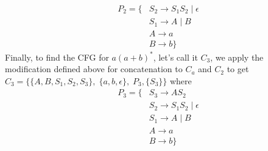 \documentclass[12pt]{article}
\begin{document}
\begin{itemize}
\begin{align}
\nonumber P_2 = \{&S_2 \rightarrow S_1S_2\;|\;\epsilon \\
\nonumber &S_1 \rightarrow A\;|\;B \\
\nonumber &A \rightarrow a \\
\nonumber &B \rightarrow b\}
\end{align}
Finally, to find the CFG for $a(a+b)^*$, let's call it $C_3$, we apply the modification defined above for concatenation to $C_a$ and $C_2$ to get $C_3=\{\{A,B, S_1, S_2, S_3\},\; \{a,b,\epsilon\},\; P_3, \{S_3\}\}$ where 
\begin{align}
\nonumber P_3 = \{&S_3 \rightarrow AS_2 \\
\nonumber &S_2 \rightarrow S_1S_2\;|\;\epsilon \\
\nonumber &S_1 \rightarrow A\;|\;B \\
\nonumber &A \rightarrow a \\
\nonumber &B \rightarrow b\}
\end{align}


\end{itemize}
\end{document}
